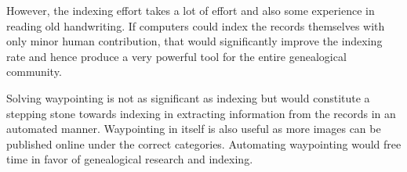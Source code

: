 However, the indexing effort takes a lot of effort and also some experience in reading old handwriting. If computers could index the records themselves with only minor human contribution, that would significantly improve the indexing rate and hence produce a very powerful tool for the entire genealogical community.

Solving waypointing is not as significant as indexing but would constitute a stepping stone towards indexing in extracting information from the records in an automated manner.
Waypointing in itself is also useful as more images can be published online under the correct categories. Automating waypointing would free time in favor of genealogical research and indexing.







